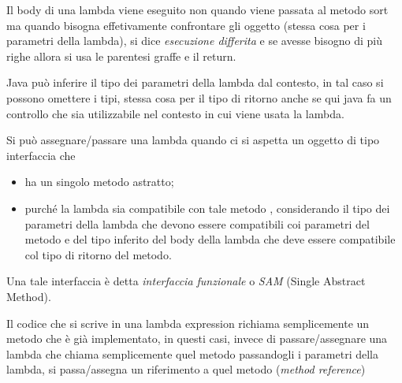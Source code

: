 Il body di una lambda viene eseguito non quando viene passata al metodo sort ma quando bisogna effetivamente confrontare gli oggetto (stessa cosa per i parametri 
della lambda), si dice \textit{esecuzione differita} e se avesse bisogno di più righe allora si usa le parentesi graffe e il return.

Java può inferire il tipo dei parametri della lambda dal contesto, in tal caso si possono omettere i tipi, stessa cosa per il tipo di ritorno anche se qui java fa un 
controllo che sia utilizzabile nel contesto in cui viene usata la lambda.

Si può assegnare/passare una lambda quando ci si aspetta un oggetto di tipo interfaccia che
\begin{itemize}
    \item ha un singolo metodo astratto;
    \item purché la lambda sia compatibile con tale metodo , considerando il tipo dei parametri della lambda che devono essere compatibili coi parametri del metodo 
    e del tipo inferito del body della lambda che deve essere compatibile col tipo di ritorno del metodo.
\end{itemize}

Una tale interfaccia è detta \textit{interfaccia funzionale} o \textit{SAM} (Single Abstract Method).

Il codice che si scrive in una lambda expression richiama semplicemente un metodo che è già implementato, in questi casi, invece di passare/assegnare una lambda che 
chiama semplicemente quel metodo passandogli i parametri della lambda, si passa/assegna un riferimento a quel metodo (\textit{method reference})
